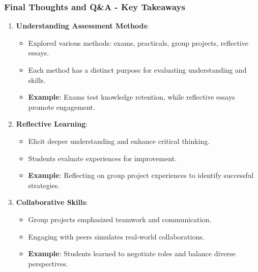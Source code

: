 \documentclass{beamer}
\begin{document}
\begin{frame}[fragile]
    \frametitle{Final Thoughts and Q\&A - Key Takeaways}
    \begin{enumerate}
        \item \textbf{Understanding Assessment Methods}:
            \begin{itemize}
                \item Explored various methods: exams, practicals, group projects, reflective essays.
                \item Each method has a distinct purpose for evaluating understanding and skills.
                \item \textbf{Example}: Exams test knowledge retention, while reflective essays promote engagement.
            \end{itemize}
        
        \item \textbf{Reflective Learning}:
            \begin{itemize}
                \item Elicit deeper understanding and enhance critical thinking.
                \item Students evaluate experiences for improvement.
                \item \textbf{Example}: Reflecting on group project experiences to identify successful strategies.
            \end{itemize}
        
        \item \textbf{Collaborative Skills}:
            \begin{itemize}
                \item Group projects emphasized teamwork and communication.
                \item Engaging with peers simulates real-world collaborations.
                \item \textbf{Example}: Students learned to negotiate roles and balance diverse perspectives.
            \end{itemize}
    \end{enumerate}
\end{frame}
\end{document}
